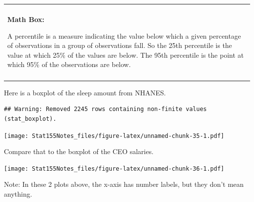 \documentclass[]{book}
\newenvironment{Shaded}{\begin{snugshade}}{\end{snugshade}}
\newcommand{\DataTypeTok}[1]{\textcolor[rgb]{0.13,0.29,0.53}{#1}}
\newcommand{\KeywordTok}[1]{\textcolor[rgb]{0.13,0.29,0.53}{\textbf{#1}}}
\newcommand{\NormalTok}[1]{#1}
\newcommand{\OperatorTok}[1]{\textcolor[rgb]{0.81,0.36,0.00}{\textbf{#1}}}
\newcommand{\StringTok}[1]{\textcolor[rgb]{0.31,0.60,0.02}{#1}}
\newenvironment{mathbox}
{
    \begin{center}
    
    \begin{tabular}{|p{0.8\textwidth}|}
    \rowcolor{LightYellow}
    \hline\\
    \rowcolor{LightYellow}
    \textbf{Math Box:}
}
{
    \\\rowcolor{LightYellow}
    \\\hline
    \end{tabular} 
    \end{center}
}
\begin{document}
\begin{mathbox}
A percentile is a measure indicating the value below which a given
percentage of observations in a group of observations fall. So the 25th
percentile is the value at which 25\% of the values are below. The 95th
percentile is the point at which 95\% of the observations are below.
\end{mathbox}

Here is a boxplot of the sleep amount from NHANES.

\begin{Shaded}
\end{Shaded}

\begin{verbatim}
## Warning: Removed 2245 rows containing non-finite values (stat_boxplot).
\end{verbatim}

\texttt{[image: Stat155Notes\_files/figure-latex/unnamed-chunk-35-1.pdf]}

Compare that to the boxplot of the CEO salaries.

\begin{Shaded}
\end{Shaded}

\texttt{[image: Stat155Notes\_files/figure-latex/unnamed-chunk-36-1.pdf]}

Note: In these 2 plots above, the x-axis has number labels, but they don't mean anything.
\end{document}
